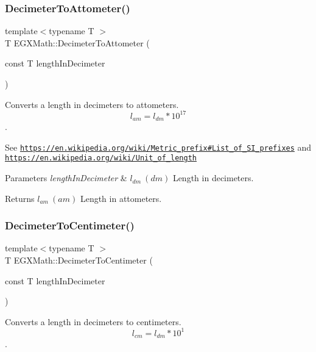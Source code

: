 \subsubsection{\texorpdfstring{Decimeter\+To\+Attometer()}{DecimeterToAttometer()}}
{\footnotesize\ttfamily template$<$typename T $>$ \\
T E\+G\+X\+Math\+::\+Decimeter\+To\+Attometer (\begin{DoxyParamCaption}\item[{const T}]{length\+In\+Decimeter }\end{DoxyParamCaption})}



Converts a length in decimeters to attometers. \[ l_{am}=l_{dm} * 10^{17} \]. 

See \href{https://en.wikipedia.org/wiki/Metric_prefix#List_of_SI_prefixes}{\tt https\+://en.\+wikipedia.\+org/wiki/\+Metric\+\_\+prefix\#\+List\+\_\+of\+\_\+\+S\+I\+\_\+prefixes} and \href{https://en.wikipedia.org/wiki/Unit_of_length}{\tt https\+://en.\+wikipedia.\+org/wiki/\+Unit\+\_\+of\+\_\+length} 
\begin{DoxyParams}{Parameters}
{\em length\+In\+Decimeter} & $ l_{dm}\ (dm)$ Length in decimeters. \\
\hline
\end{DoxyParams}
\begin{DoxyReturn}{Returns}
$ l_{am}\ (am)$ Length in attometers. 
\end{DoxyReturn}
\mbox{\label{group___e_g_x_math-_conversions-_length_conversions-_s_i-_decimeter-_s_i_ga032e40ec973eb890908799b87ba41710}} 
\subsubsection{\texorpdfstring{Decimeter\+To\+Centimeter()}{DecimeterToCentimeter()}}
{\footnotesize\ttfamily template$<$typename T $>$ \\
T E\+G\+X\+Math\+::\+Decimeter\+To\+Centimeter (\begin{DoxyParamCaption}\item[{const T}]{length\+In\+Decimeter }\end{DoxyParamCaption})}



Converts a length in decimeters to centimeters. \[ l_{cm}=l_{dm} * 10^{1} \]. 

